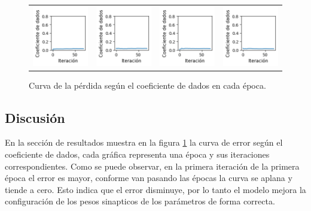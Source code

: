 \begin{figure}[!b]
\begin{tabular}{cccc}
        \includegraphics[width=3.5cm]{../Plots/dl_epoch_12.png} &
        \includegraphics[width=3.5cm]{../Plots/dl_epoch_13.png} &
        \includegraphics[width=3.5cm]{../Plots/dl_epoch_14.png} &

        \includegraphics[width=3.5cm]{../Plots/dl_epoch_15.png} \\

    \end{tabular}        
    \caption{Curva de la pérdida según el coeficiente de dados en cada época.}
    \label{fig:dice_loss_epochs}
\end{figure}


\subsection{Discusión}
En la sección de resultados muestra en la figura \ref{fig:dice_loss_epochs} la curva de error según el coeficiente de dados, cada gráfica representa una época y sus iteraciones correspondientes. Como se puede observar, en la primera iteración de la primera época el error es mayor, conforme van pasando las épocas la curva se aplana y tiende a cero. Esto indica que el error disminuye, por lo tanto el modelo mejora la configuración de los pesos sinapticos de los parámetros de forma correcta. 

